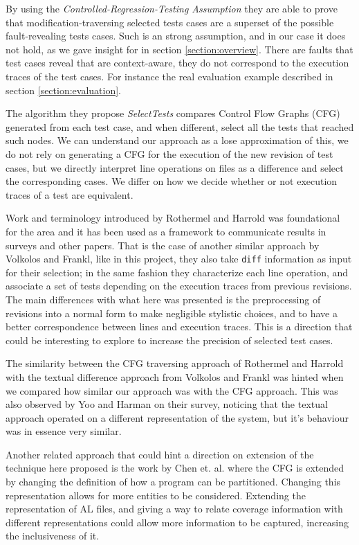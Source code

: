 \documentclass{article}
\begin{document}
By using the \emph{Controlled-Regression-Testing Assumption} they are able to prove that modification-traversing selected tests cases are a superset of the possible fault-revealing tests cases. Such is an strong assumption, and in our case it does not hold, as we gave insight for in section \ref{section:overview}. There are faults that test cases reveal that are context-aware, they do not correspond to the execution traces of the test cases. For instance the real evaluation example described in section \ref{section:evaluation}.

The algorithm they propose \emph{SelectTests} compares Control Flow Graphs (CFG) generated from each test case, and when different, select all the tests that reached such nodes. We can understand our approach as a lose approximation of this, we do not rely on generating a CFG for the execution of the new revision of test cases, but we directly interpret line operations on files as a difference and select the corresponding cases. We differ on how we decide whether or not execution traces of a test are equivalent.

Work and terminology introduced by Rothermel and Harrold was foundational for the area and it has been used as a framework to communicate results in surveys and other papers. That is the case of another similar approach by Volkolos and Frankl, like in this project, they also take \texttt{diff} information as input for their selection; in the same fashion they characterize each line operation, and associate a set of tests depending on the execution traces from previous revisions. The main differences with what here was presented is the preprocessing of revisions into a normal form to make negligible stylistic choices, and to have a better correspondence between lines and execution traces. This is a direction that could be interesting to explore to increase the precision of selected test cases.

The similarity between the CFG traversing approach of Rothermel and Harrold with the textual difference approach from Volkolos and Frankl was hinted when we compared how similar our approach was with the CFG approach. This was also observed by Yoo and Harman on their survey, noticing that the textual approach operated on a different representation of the system, but it's behaviour was in essence very similar.

Another related approach that could hint a direction on extension of the technique here proposed is the work by Chen et. al. \cite{TODO} where the CFG is extended by changing the definition of how a program can be partitioned. Changing this representation allows for more entities to be considered. Extending the representation of AL files, and giving a way to relate coverage information with different representations could allow more information to be captured, increasing the inclusiveness of it.
\end{document}
